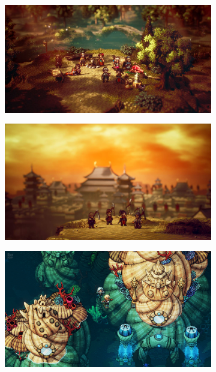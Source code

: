 \documentclass[a4paper,10pt,english]{article}
\begin{document}
\begin{figure}[h]
\centering

\begin{subfigure}{0.70\linewidth}
\includegraphics[width=\linewidth]{style1.jpg}
\label{Fig:Style1A}
\end{subfigure}\hfill
%
\begin{subfigure}{0.70\linewidth}
\includegraphics[width=\linewidth]{style2.jpg}
\label{Fig:Style1B}
\end{subfigure}\hfill
%


\begin{subfigure}{0.70\linewidth}
\includegraphics[width=\linewidth]{style5.jpg}
\label{Fig:Style1C}
\end{subfigure}


\end{figure}
\end{document}
